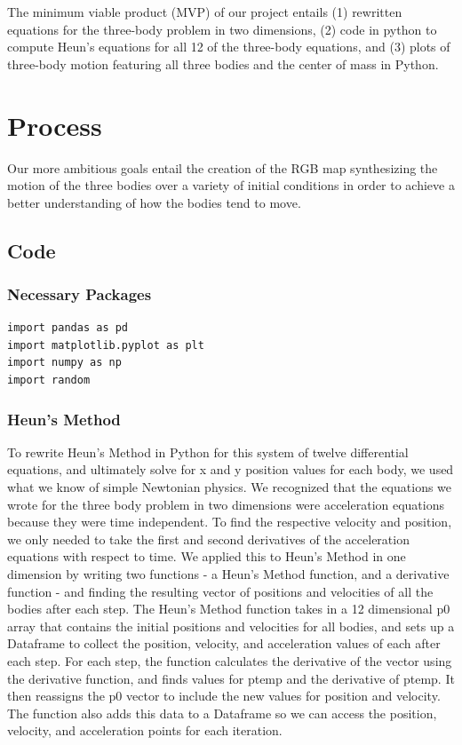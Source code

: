 \documentclass{article}
\begin{document}
The minimum viable product (MVP) of our project entails (1) rewritten equations for the three-body problem in two dimensions, (2) code in python to compute Heun's equations for all 12 of the three-body equations, and (3) plots of three-body motion featuring all three bodies and the center of mass in Python. 

\section{Process}
Our more ambitious goals entail the creation of the RGB map synthesizing the motion of the three bodies over a variety of initial conditions in order to achieve a better understanding of how the bodies tend to move. 
\subsection{Code}
\subsubsection{Necessary Packages}
\begin{verbatim}
import pandas as pd
import matplotlib.pyplot as plt
import numpy as np
import random
\end{verbatim}

\subsubsection{Heun's Method}
To rewrite Heun's Method in Python for this system of twelve differential equations, and ultimately solve for x and y position values for each body, we used what we know of simple Newtonian physics. We recognized that the equations we wrote for the three body problem in two dimensions were acceleration equations because they were time independent. To find the respective velocity and position, we only needed to take the first and second derivatives of the acceleration equations with respect to time.
We applied this to Heun's Method in one dimension by writing two functions - a Heun's Method function, and a derivative function - and finding the resulting vector of positions and velocities of all the bodies after each step. The Heun's Method function takes in a 12 dimensional p0 array that contains the initial positions and velocities for all bodies, and sets up a Dataframe to collect the position, velocity, and acceleration values of each after each step. For each step, the function calculates the derivative of the vector using the derivative function, and finds values for ptemp and the derivative of ptemp. It then reassigns the p0 vector to include the new values for position and velocity. The function also adds this data to a Dataframe so we can access the position, velocity, and acceleration points for each iteration.
\end{document}

